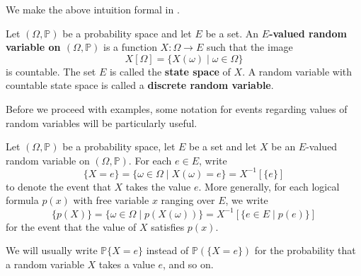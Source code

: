 We make the above intuition formal in .

\begin{definition}
\label{defRandomVariable}
Let $(\Omega,\mathbb{P})$ be a probability space and let $E$ be a set. An \textbf{$E$-valued random variable on $(\Omega,\mathbb{P})$} is a function $X : \Omega \to E$ such that the image
\[ X[\Omega] = \{ X(\omega) \mid \omega \in \Omega \} \]
is countable. The set $E$ is called the \textbf{state space} of $X$. A random variable with countable state space is called a \textbf{discrete random variable}.
\end{definition}

Before we proceed with examples, some notation for events regarding values of random variables will be particularly useful.

\begin{notation}
\label{ntnRandomVariableEvents}
Let $(\Omega,\mathbb{P})$ be a probability space, let $E$ be a set and let $X$ be an $E$-valued random variable on $(\Omega,\mathbb{P})$. For each $e \in E$, write
\[ \{ X = e \} = \{ \omega \in \Omega \mid X(\omega) = e \} = X^{-1}[\{ e \}] \]
to denote the event that $X$ takes the value $e$. More generally, for each logical formula $p(x)$ with free variable $x$ ranging over $E$, we write
\[ \{ p(X) \} = \{ \omega \in \Omega \mid p(X(\omega)) \} = X^{-1}[ \{ e \in E \mid p(e) \}] \]
for the event that the value of $X$ satisfies $p(x)$.
\end{notation}

We will usually write $\mathbb{P}\{X=e\}$ instead of $\mathbb{P}(\{X=e\})$ for the probability that a random variable $X$ takes a value $e$, and so on.

